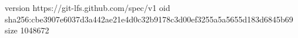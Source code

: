 version https://git-lfs.github.com/spec/v1
oid sha256:cbe3907e6037d3a442ae21e4d0c32b9178c3d00ef3255a5a5655d183d6845b69
size 1048672
